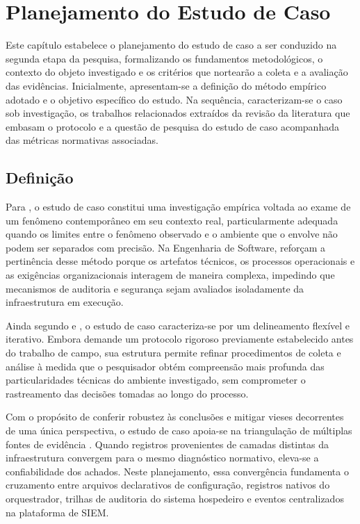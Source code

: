 \chapter{Planejamento do Estudo de Caso}
\label{cap:estudo_de_caso}

Este capítulo estabelece o planejamento do estudo de caso a ser conduzido na segunda etapa da pesquisa, formalizando os fundamentos metodológicos, o contexto do objeto investigado e os critérios que nortearão a coleta e a avaliação das evidências. Inicialmente, apresentam-se a definição do método empírico adotado e o objetivo específico do estudo. Na sequência, caracterizam-se o caso sob investigação, os trabalhos relacionados extraídos da revisão da literatura que embasam o protocolo e a questão de pesquisa do estudo de caso acompanhada das métricas normativas associadas.

\section{Definição}
\label{sec:ec_definicao}

Para , o estudo de caso constitui uma investigação empírica voltada ao exame de um fenômeno contemporâneo em seu contexto real, particularmente adequada quando os limites entre o fenômeno observado e o ambiente que o envolve não podem ser separados com precisão. Na Engenharia de Software,  reforçam a pertinência desse método porque os artefatos técnicos, os processos operacionais e as exigências organizacionais interagem de maneira complexa, impedindo que mecanismos de auditoria e segurança sejam avaliados isoladamente da infraestrutura em execução.

Ainda segundo  e , o estudo de caso caracteriza-se por um delineamento flexível e iterativo. Embora demande um protocolo rigoroso previamente estabelecido antes do trabalho de campo, sua estrutura permite refinar procedimentos de coleta e análise à medida que o pesquisador obtém compreensão mais profunda das particularidades técnicas do ambiente investigado, sem comprometer o rastreamento das decisões tomadas ao longo do processo.

Com o propósito de conferir robustez às conclusões e mitigar vieses decorrentes de uma única perspectiva, o estudo de caso apoia-se na triangulação de múltiplas fontes de evidência \cite{yin2015,runeson2009}. Quando registros provenientes de camadas distintas da infraestrutura convergem para o mesmo diagnóstico normativo, eleva-se a confiabilidade dos achados. Neste planejamento, essa convergência fundamenta o cruzamento entre arquivos declarativos de configuração, registros nativos do orquestrador, trilhas de auditoria do sistema hospedeiro e eventos centralizados na plataforma de SIEM.

